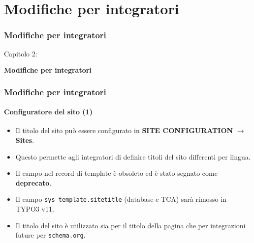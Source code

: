%

\section{Modifiche per integratori}
\begin{frame}[fragile]
	\frametitle{Modifiche per integratori}

	\begin{center}\huge{Capitolo 2:}\end{center}
	\begin{center}\huge{\color{typo3darkgrey}\textbf{Modifiche per integratori}}\end{center}

\end{frame}


\begin{frame}[fragile]
	\frametitle{Modifiche per integratori}
	\framesubtitle{Configuratore del sito (1)}

	\begin{itemize}

		\item Il titolo del sito può essere configurato in
			\textbf{SITE CONFIGURATION} $\rightarrow$ \textbf{Sites}.
		\item Questo permette agli integratori di definire titoli del sito differenti per lingua.
		\item Il campo nel record di template è obsoleto ed è stato segnato come \textbf{deprecato}.
		\item Il campo \texttt{sys\_template.sitetitle} (database e TCA) sarà rimosso in TYPO3 v11.
		\item Il titolo del sito è utilizzato sia per il titolo della pagina che per integrazioni
			future per \texttt{schema.org}.
	\end{itemize}

\end{frame}



